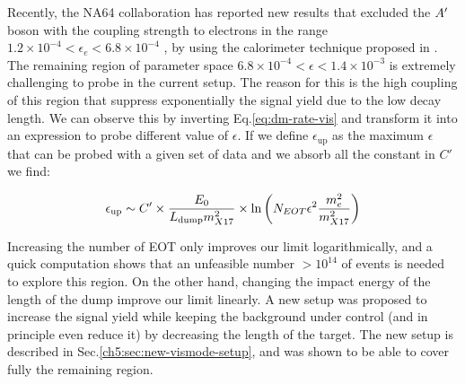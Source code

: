 Recently, the NA64 collaboration has reported new results that excluded the $A'$ boson  with the coupling strength  to electrons in the range $1.2 \times 10^{-4} < \epsilon_e < 6.8 \times 10^{-4}$ \cite{Banerjee:2018vgk,Banerjee:2019hmi}, by using the calorimeter technique proposed in \cite{Gninenko:2013rka,Andreas:2013lya}. The remaining region of parameter space $6.8 \times 10^{-4} < \epsilon < 1.4 \times 10^{-3}$ is extremely challenging to probe in the current setup. The reason for this is the high coupling of this region that suppress exponentially the signal yield due to the low decay length. We can observe this by inverting Eq.\ref{eq:dm-rate-vis} and transform it into an expression to probe different value of $\epsilon$. If we define $\epsilon_{\textrm{up}}$ as the maximum $\epsilon$ that can be probed with a given set of data and we absorb all the constant in $C'$ we find:

\begin{equation}
  \label{eq:x17-coverage}
  \epsilon_{\textrm{up}} \sim C' \times \frac{E_0}{L_{\textrm{dump}}m^2_{X17}} \times \ln{\left(N_{EOT} \epsilon^2 \frac{m_e^2}{m_{X17}^2}\right)}
\end{equation}

Increasing the number of EOT only improves our limit logarithmically, and a quick computation shows that an unfeasible number $>10^{14}$ of events is needed to explore this region. On the other hand, changing the impact energy of the length of the dump improve our limit linearly. A new setup was proposed to increase the signal yield while keeping the background under control (and in principle even reduce it) by decreasing the length of the target. The new setup is described in Sec.\ref{ch5:sec:new-vismode-setup}, and was shown to be able to cover fully the remaining region.


